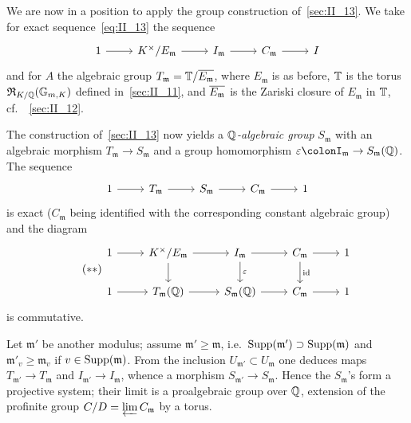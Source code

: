 We are now in a position to apply the group construction of~\ref{sec:II_13}.
We take for exact sequence~\ref{eq:II_13} the sequence 
\[
	\begin{tikzcd}
		1 \arrow[r] & K^{\times} / E_\mathfrak{m} \arrow[r] & I_\mathfrak{m} 
		\arrow[r] & C_\mathfrak{m} \arrow[r] & I
	\end{tikzcd}
\]
and for $A$ the algebraic group $T_\mathfrak{m} = \mathbb{T} / \overline{E_\mathfrak{m}}
$, where $E_\mathfrak{m}$ is as before, $\mathbb{T}$ is the torus $\operatorname{\mathfrak{R}}_{K/\mathbb{Q}}(
\mathbb{G}_{m, K})$ defined in~\ref{sec:II_11}, and $\overline{E_\mathfrak{m}}$ is the 
\dpage
Zariski closure of $E_\mathfrak{m}$ in $\mathbb{T}$, cf.\ ~\ref{sec:II_12}.

The construction of~\ref{sec:II_13} now yields a \emph{$\mathbb{Q}$-algebraic group} 
$S_\mathfrak{m}$ with an algebraic morphism $T_\mathfrak{m} \to S_\mathfrak{m}$ 
and a group homomorphism $\varepsilon\colonI_\mathfrak{m} \to S_\mathfrak{m} (\Q)$.
The sequence 
\[
\begin{tikzcd}
	1 \arrow[r] & T_\mathfrak{m} \arrow[r] & S_\mathfrak{m} \arrow[r] &
	C_\mathfrak{m} \arrow[r] & 1
\end{tikzcd}
\]
is exact ($C_\mathfrak{m}$ being identified with the corresponding constant 
algebraic group) and the diagram 
\begin{equation}\tag{$**$}\label{eq:II_22}
	\begin{tikzcd}
		1 \arrow[r] & K^\times / E_\mathfrak{m} \arrow[r] \arrow[d] & 
		I_\mathfrak{m} \arrow[r] \arrow[d, "\varepsilon"] & C_\mathfrak{m} 
		\arrow[r] \arrow[d, "\id"] & 1 \\
		1 \arrow[r] & T_\mathfrak{m}(\Q) \arrow[r] & S_\mathfrak{m}
		(\Q) \arrow[r] & C_\mathfrak{m} \arrow[r] & 1
	\end{tikzcd}
\end{equation}
is commutative.

\begin{obs}
Let $\mathfrak{m}'$ be another modulus; assume $\mathfrak{m}' \geq \mathfrak{m}
$, i.e.\ $\operatorname{Supp}(\mathfrak{m}') \supset \operatorname{Supp}(\mathfrak{m})$ and 
$\mathfrak{m}'_v \geq \mathfrak{m}_v$ if $v \in \operatorname{Supp}(\mathfrak{m})$. From the  
inclusion $U_{\mathfrak{m}'} \subset U_\mathfrak{m}$ one deduces maps $T_{
\mathfrak{m}'} \to T_\mathfrak{m}$ and $I_{\mathfrak{m}'} \to I_\mathfrak{m}$,
whence a morphism $S_{\mathfrak{m}'} \to S_\mathfrak{m}$. Hence the 
$S_\mathfrak{m}$'s form a projective system; their limit is a proalgebraic 
group over $\mathbb{Q}$, extension of the profinite group $C/D = \varprojlim
C_{\mathfrak{m}}$ by a torus.
\end{obs}


